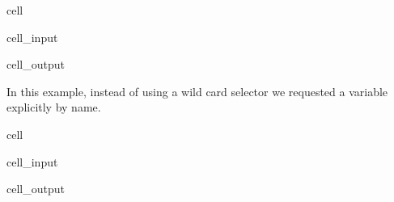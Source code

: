 \documentclass[letterpaper,10pt,english]{jupyterBook}
\begin{document}
\begin{sphinxuseclass}{cell}\begin{sphinxVerbatimInput}

\begin{sphinxuseclass}{cell_input}
\begin{sphinxVerbatim}[commandchars=\\\{\}]
\PYG{p}{[}\PYG{p}{]} 
\end{sphinxVerbatim}

\end{sphinxuseclass}\end{sphinxVerbatimInput}
\begin{sphinxVerbatimOutput}

\begin{sphinxuseclass}{cell_output}
\noindent{}

\end{sphinxuseclass}\end{sphinxVerbatimOutput}

\end{sphinxuseclass}
\sphinxAtStartPar
In this example, instead of using a wild card selector we requested a variable explicitly by name.

\begin{sphinxuseclass}{cell}\begin{sphinxVerbatimInput}

\begin{sphinxuseclass}{cell_input}
\begin{sphinxVerbatim}[commandchars=\\\{\}]
\PYG{p}{[}\PYG{p}{]} 
\end{sphinxVerbatim}

\end{sphinxuseclass}\end{sphinxVerbatimInput}
\begin{sphinxVerbatimOutput}

\begin{sphinxuseclass}{cell_output}
\noindent{}

\end{sphinxuseclass}\end{sphinxVerbatimOutput}

\end{sphinxuseclass}
\end{document}
